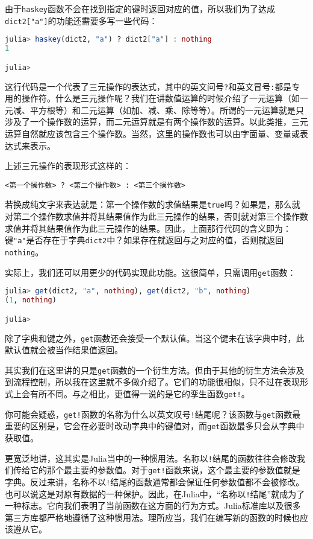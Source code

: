 由于\verb|haskey|函数不会在找到指定的键时返回对应的值，所以我们为了达成\verb|dict2["a"]|的功能还需要多写一些代码：
\begin{lstlisting}[language=julia]
julia> haskey(dict2, "a") ? dict2["a"] : nothing
1

julia> 
\end{lstlisting}

这行代码是一个代表了三元操作的表达式，其中的英文问号\verb|?|和英文冒号\verb|:|都是专用的操作符。什么是三元操作呢？我们在讲数值运算的时候介绍了一元运算（如一元减、平方根等）和二元运算（如加、减、乘、除等等）。所谓的一元运算就是只涉及了一个操作数的运算，而二元运算就是有两个操作数的运算。以此类推，三元运算自然就应该包含三个操作数。当然，这里的操作数也可以由字面量、变量或表达式来表示。

上述三元操作的表现形式这样的：
\begin{lstlisting}[language=none]
<第一个操作数> ? <第二个操作数> : <第三个操作数>
\end{lstlisting}


若换成纯文字来表达就是：第一个操作数的求值结果是\verb|true|吗？如果是，那么就对第二个操作数求值并将其结果值作为此三元操作的结果，否则就对第三个操作数求值并将其结果值作为此三元操作的结果。因此，上面那行代码的含义即为：键\verb|"a"|是否存在于字典\verb|dict2|中？如果存在就返回与之对应的值，否则就返回\verb|nothing|。

实际上，我们还可以用更少的代码实现此功能。这很简单，只需调用\verb|get|函数：
\begin{lstlisting}[language=julia]
julia> get(dict2, "a", nothing), get(dict2, "b", nothing)
(1, nothing)

julia> 
\end{lstlisting}

除了字典和键之外，\verb|get|函数还会接受一个默认值。当这个键未在该字典中时，此默认值就会被当作结果值返回。

其实我们在这里讲的只是\verb|get|函数的一个衍生方法。但由于其他的衍生方法会涉及到流程控制，所以我在这里就不多做介绍了。它们的功能很相似，只不过在表现形式上会有所不同。与之相比，更值得一说的是它的孪生函数\verb|get!|。

你可能会疑惑，\verb|get!|函数的名称为什么以英文叹号\verb|!|结尾呢？该函数与\verb|get|函数最重要的区别是，它会在必要时改动字典中的键值对，而\verb|get|函数最多只会从字典中获取值。

更宽泛地讲，这其实是Julia当中的一种惯用法。名称以\verb|!|结尾的函数往往会修改我们传给它的那个最主要的参数值。对于\verb|get!|函数来说，这个最主要的参数值就是字典。反过来讲，名称不以\verb|!|结尾的函数通常都会保证任何参数值都不会被修改。也可以说这是对原有数据的一种保护。因此，在Julia中，“名称以\verb|!|结尾”就成为了一种标志。它向我们表明了当前函数在这方面的行为方式。Julia标准库以及很多第三方库都严格地遵循了这种惯用法。理所应当，我们在编写新的函数的时候也应该遵从它。

